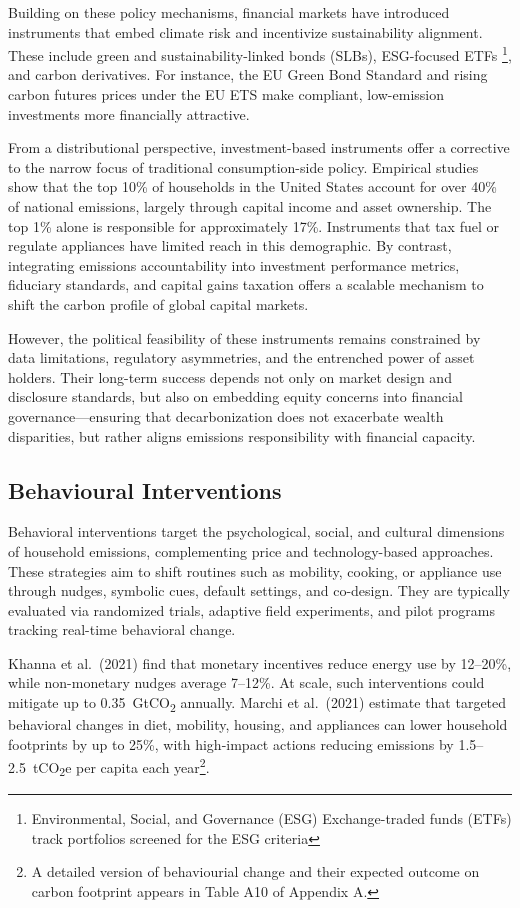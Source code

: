 \documentclass[12pt,a4paper]{article}%
\begin{document}
Building on these policy mechanisms, financial markets have introduced instruments that embed climate risk and incentivize sustainability alignment. These include green and sustainability-linked bonds (SLBs), ESG-focused ETFs \footnote{Environmental, Social, and Governance (ESG) Exchange-traded funds (ETFs) track portfolios screened for the ESG criteria}, and carbon derivatives. For instance, the EU Green Bond Standard and rising carbon futures prices under the EU ETS make compliant, low-emission investments more financially attractive.

From a distributional perspective, investment-based instruments offer a corrective to the narrow focus of traditional consumption-side policy. Empirical studies show that the top 10\% of households in the United States account for over 40\% of national emissions, largely through capital income and asset ownership. The top 1\% alone is responsible for approximately 17\%. Instruments that tax fuel or regulate appliances have limited reach in this demographic. By contrast, integrating emissions accountability into investment performance metrics, fiduciary standards, and capital gains taxation offers a scalable mechanism to shift the carbon profile of global capital markets.

However, the political feasibility of these instruments remains constrained by data limitations, regulatory asymmetries, and the entrenched power of asset holders. Their long-term success depends not only on market design and disclosure standards, but also on embedding equity concerns into financial governance---ensuring that decarbonization does not exacerbate wealth disparities, but rather aligns emissions responsibility with financial capacity.


\subsection{Behavioural Interventions}

Behavioral interventions target the psychological, social, and cultural dimensions of household emissions, complementing price and technology-based approaches. These strategies aim to shift routines such as mobility, cooking, or appliance use through nudges, symbolic cues, default settings, and co-design. They are typically evaluated via randomized trials, adaptive field experiments, and pilot programs tracking real-time behavioral change.

Khanna et al.\ (2021) find that monetary incentives reduce energy use by 12--20\%, while non-monetary nudges average 7--12\%. At scale, such interventions could mitigate up to 0.35~GtCO\textsubscript{2} annually. Marchi et al.\ (2021) estimate that targeted behavioral changes in diet, mobility, housing, and appliances can lower household footprints by up to 25\%, with high-impact actions reducing emissions by 1.5--2.5~tCO\textsubscript{2}e per capita each year\footnote{ A detailed version of behaviourial change and their expected outcome on carbon footprint appears in Table A10 of Appendix A.}.
\end{document}
